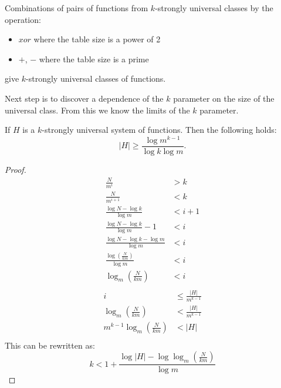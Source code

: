 \begin{corollary}
Combinations of pairs of functions from $k$-strongly universal classes by the operation:
\begin{itemize}
\item $xor$ where the table size is a power of 2
\item $+$, $-$ where the table size is a prime
\end{itemize}
give $k$-strongly universal classes of functions.
\end{corollary}

Next step is to discover a dependence of the $k$ parameter on the size of the universal class. From this we know the limits of the $k$ parameter. 
\begin{theorem}
If $H$ is a $k$-strongly universal system of functions. Then the following holds:
\begin{displaymath}
|H| \geq \frac{\log m ^ {k - 1}}{\log k \log m} \textit{.}
\end{displaymath}
\end{theorem}
\begin{proof}
\begin{displaymath}
\begin{split}
\frac{N}{m^i} & > k \\
\frac{N}{m^{i + 1}} & < k \\
\frac{\log N - \log k}{\log m} & < i + 1 \\
\frac{\log N - \log k}{\log m} - 1 & < i \\
\frac{\log N - \log k - \log m}{\log m} & < i \\
\frac{\log \left( \frac{N}{km} \right)}{\log m} & < i \\
\log_m \left( \frac{N}{km} \right) & < i \\
\end{split}
\end{displaymath}
\begin{displaymath}
\begin{split}
i & \le \frac{|H|}{m^{k - 1}} \\
\log_m \left( \frac{N}{km} \right) & < \frac{|H|}{m^{k - 1}} \\
m^{k - 1} \log_m \left( \frac{N}{km} \right) & < |H| \\
\end{split}
\end{displaymath}
This can be rewritten as:
\begin{displaymath}
k < 1 + \frac{\log |H| - \log \log_m \left( \frac{N}{km} \right)}{\log m}
\end{displaymath}
\end{proof}

